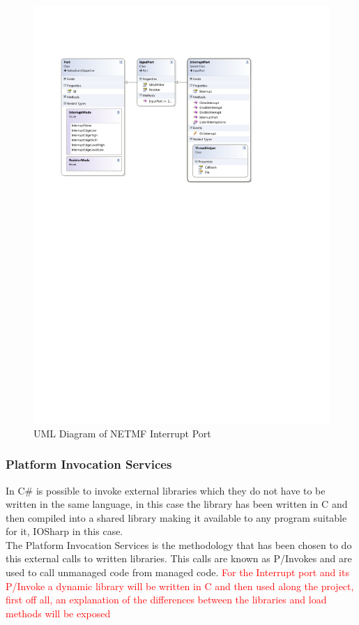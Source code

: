 \begin{figure}[H]\begin{center}
 \centering
  \captionsetup{justification=centering}
  \includegraphics[width=1\textwidth]{pictures/iosharp/interrupt-uml}
  \caption{UML Diagram of NETMF Interrupt Port \label{fig:interrupt-uml}}
\end{center}\end{figure}

\subsubsection{Platform Invocation Services}\label{SSS:IOSharp-Interrupt-PInvoke}
In C\# is possible to invoke external libraries which they do not have to be written in the same language, in this case the library has been written in C and then compiled into a shared library making it available to any program suitable for it, IOSharp in this case.
\\
The Platform Invocation Services is the methodology that has been chosen to do this external calls to written libraries. This calls are known as P/Invokes and are used to call unmanaged code from managed code. \textcolor{red}{For the Interrupt port and its P/Invoke a dynamic library will be written in C and then used along the project, first off all, an explanation of the differences between the libraries and load methods will be exposed}

